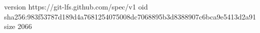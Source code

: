version https://git-lfs.github.com/spec/v1
oid sha256:983f53787d189d4a7681254075008dc7068895b3d8388907c6bca9e5413d2a91
size 2066

